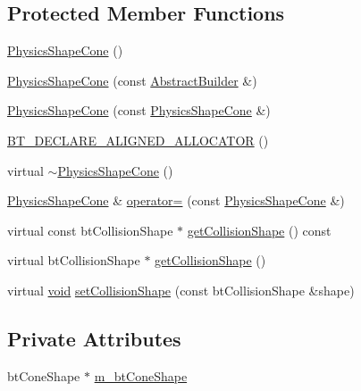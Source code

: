 \subsection*{Protected Member Functions}
\begin{DoxyCompactItemize}
\item 
\mbox{\hyperlink{classnjli_1_1_physics_shape_cone_ac6a158806b78bae84ee7cc425d246ce8}{Physics\+Shape\+Cone}} ()
\item 
\mbox{\hyperlink{classnjli_1_1_physics_shape_cone_a4e3d15653670e4817d297dbfc777abb9}{Physics\+Shape\+Cone}} (const \mbox{\hyperlink{classnjli_1_1_abstract_builder}{Abstract\+Builder}} \&)
\item 
\mbox{\hyperlink{classnjli_1_1_physics_shape_cone_a99e81748a3195479cd0dac23217450a1}{Physics\+Shape\+Cone}} (const \mbox{\hyperlink{classnjli_1_1_physics_shape_cone}{Physics\+Shape\+Cone}} \&)
\item 
\mbox{\hyperlink{classnjli_1_1_physics_shape_cone_ae1ef881259006695699643498812b147}{B\+T\+\_\+\+D\+E\+C\+L\+A\+R\+E\+\_\+\+A\+L\+I\+G\+N\+E\+D\+\_\+\+A\+L\+L\+O\+C\+A\+T\+OR}} ()
\item 
virtual \mbox{\hyperlink{classnjli_1_1_physics_shape_cone_a13149f9a82c2c2bb600f4135af362d95}{$\sim$\+Physics\+Shape\+Cone}} ()
\item 
\mbox{\hyperlink{classnjli_1_1_physics_shape_cone}{Physics\+Shape\+Cone}} \& \mbox{\hyperlink{classnjli_1_1_physics_shape_cone_ad649d8d18a88ccedd68e4dda3b3b8c0f}{operator=}} (const \mbox{\hyperlink{classnjli_1_1_physics_shape_cone}{Physics\+Shape\+Cone}} \&)
\item 
virtual const bt\+Collision\+Shape $\ast$ \mbox{\hyperlink{classnjli_1_1_physics_shape_cone_a39f88d5fcc1139aa139c9d9163240e9a}{get\+Collision\+Shape}} () const
\item 
virtual bt\+Collision\+Shape $\ast$ \mbox{\hyperlink{classnjli_1_1_physics_shape_cone_a504851418142c2a7abd89c3861f09caf}{get\+Collision\+Shape}} ()
\item 
virtual \mbox{\hyperlink{_thread_8h_af1e856da2e658414cb2456cb6f7ebc66}{void}} \mbox{\hyperlink{classnjli_1_1_physics_shape_cone_a9d1a22e39d9a3b70646df7ff58bd46c0}{set\+Collision\+Shape}} (const bt\+Collision\+Shape \&shape)
\end{DoxyCompactItemize}
\subsection*{Private Attributes}
\begin{DoxyCompactItemize}
\item 
bt\+Cone\+Shape $\ast$ \mbox{\hyperlink{classnjli_1_1_physics_shape_cone_a650023829d4961897114be23b7123c56}{m\+\_\+bt\+Cone\+Shape}}
\end{DoxyCompactItemize}
